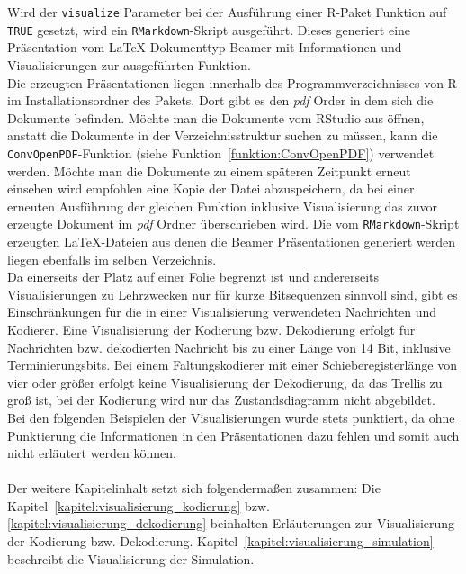 Wird der \texttt{visualize} Parameter bei der Ausführung einer R-Paket Funktion auf \texttt{TRUE} gesetzt, wird ein \texttt{RMarkdown}-Skript ausgeführt. Dieses generiert eine  Präsentation vom \LaTeX -Dokumenttyp Beamer mit Informationen und Visualisierungen zur ausgeführten Funktion.
\\
Die erzeugten Präsentationen liegen innerhalb des Programmverzeichnisses von R im Installationsordner des Pakets. Dort gibt es den \emph{pdf} Order in dem sich die Dokumente befinden. Möchte man die Dokumente vom RStudio aus öffnen, anstatt die Dokumente in der Verzeichnisstruktur suchen zu müssen, kann die \texttt{ConvOpenPDF}-Funktion (siehe Funktion~\ref{funktion:ConvOpenPDF}) verwendet werden. Möchte man die Dokumente zu einem späteren Zeitpunkt erneut einsehen wird empfohlen eine Kopie der Datei abzuspeichern, da bei einer erneuten Ausführung der gleichen Funktion inklusive Visualisierung das zuvor erzeugte Dokument im \emph{pdf} Ordner überschrieben wird. Die vom \texttt{RMarkdown}-Skript erzeugten \LaTeX -Dateien aus denen die Beamer Präsentationen generiert werden liegen ebenfalls im selben Verzeichnis.
\\
Da einerseits der Platz auf einer Folie begrenzt ist und andererseits Visualisierungen zu Lehrzwecken nur für kurze Bitsequenzen sinnvoll sind, gibt es Einschränkungen für die in einer Visualisierung verwendeten Nachrichten und Kodierer. Eine Visualisierung der Kodierung bzw. Dekodierung erfolgt für Nachrichten bzw. dekodierten Nachricht bis zu einer Länge von 14 Bit, inklusive Terminierungsbits. Bei einem Faltungskodierer mit einer Schieberegisterlänge von vier oder größer erfolgt keine Visualisierung der Dekodierung, da das Trellis zu groß ist, bei der Kodierung wird nur das Zustandsdiagramm nicht abgebildet.
\\
Bei den folgenden Beispielen der Visualisierungen wurde stets punktiert, da ohne Punktierung die Informationen in den Präsentationen dazu fehlen und somit auch nicht erläutert werden können.
\\
\\
Der weitere Kapitelinhalt setzt sich folgendermaßen zusammen: Die Kapitel~\ref{kapitel:visualisierung_kodierung} bzw. \ref{kapitel:visualisierung_dekodierung} beinhalten Erläuterungen zur Visualisierung der Kodierung bzw. Dekodierung. Kapitel~\ref{kapitel:visualisierung_simulation} beschreibt die Visualisierung der Simulation.
